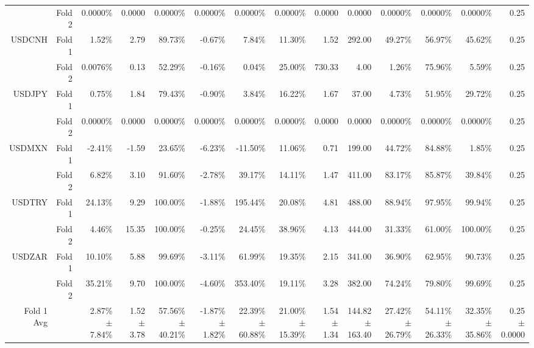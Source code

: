 \begin{table}[H]
{\begin{tabular}{rrrrrrrrrrrrrr}
 & Fold 2 & 0.0000\% & 0.0000 & 0.0000\% & 0.0000\% & 0.0000\% & 0.0000\% & 0.0000 & 0.0000 & 0.0000\% & 0.0000\% & 0.0000\% & 0.25 \\
USDCNH & Fold 1 & 1.52\% & 2.79 & 89.73\% & -0.67\% & 7.84\% & 11.30\% & 1.52 & 292.00 & 49.27\% & 56.97\% & 45.62\% & 0.25 \\
 & Fold 2 & 0.0076\% & 0.13 & 52.29\% & -0.16\% & 0.04\% & 25.00\% & 730.33 & 4.00 & 1.26\% & 75.96\% & 5.59\% & 0.25 \\
USDJPY & Fold 1 & 0.75\% & 1.84 & 79.43\% & -0.90\% & 3.84\% & 16.22\% & 1.67 & 37.00 & 4.73\% & 51.95\% & 29.72\% & 0.25 \\
 & Fold 2 & 0.0000\% & 0.0000 & 0.0000\% & 0.0000\% & 0.0000\% & 0.0000\% & 0.0000 & 0.0000 & 0.0000\% & 0.0000\% & 0.0000\% & 0.25 \\
USDMXN & Fold 1 & -2.41\% & -1.59 & 23.65\% & -6.23\% & -11.50\% & 11.06\% & 0.71 & 199.00 & 44.72\% & 84.88\% & 1.85\% & 0.25 \\
 & Fold 2 & 6.82\% & 3.10 & 91.60\% & -2.78\% & 39.17\% & 14.11\% & 1.47 & 411.00 & 83.17\% & 85.87\% & 39.84\% & 0.25 \\
USDTRY & Fold 1 & 24.13\% & 9.29 & 100.00\% & -1.88\% & 195.44\% & 20.08\% & 4.81 & 488.00 & 88.94\% & 97.95\% & 99.94\% & 0.25 \\
 & Fold 2 & 4.46\% & 15.35 & 100.00\% & -0.25\% & 24.45\% & 38.96\% & 4.13 & 444.00 & 31.33\% & 61.00\% & 100.00\% & 0.25 \\
USDZAR & Fold 1 & 10.10\% & 5.88 & 99.69\% & -3.11\% & 61.99\% & 19.35\% & 2.15 & 341.00 & 36.90\% & 62.95\% & 90.73\% & 0.25 \\
 & Fold 2 & 35.21\% & 9.70 & 100.00\% & -4.60\% & 353.40\% & 19.11\% & 3.28 & 382.00 & 74.24\% & 79.80\% & 99.69\% & 0.25 \\
\midrule
\midrule
Fold 1 Avg &  & \shortstack{2.87\% \\ $\pm$ 7.84\%} & \shortstack{1.52 \\ $\pm$ 3.78} & \shortstack{57.56\% \\ $\pm$ 40.21\%} & \shortstack{-1.87\% \\ $\pm$ 1.82\%} & \shortstack{22.39\% \\ $\pm$ 60.88\%} & \shortstack{21.00\% \\ $\pm$ 15.39\%} & \shortstack{1.54 \\ $\pm$ 1.34} & \shortstack{144.82 \\ $\pm$ 163.40} & \shortstack{27.42\% \\ $\pm$ 26.79\%} & \shortstack{54.11\% \\ $\pm$ 26.33\%} & \shortstack{32.35\% \\ $\pm$ 35.86\%} & \shortstack{0.25 \\ $\pm$ 0.0000} \\

\end{tabular}}
\end{table}
